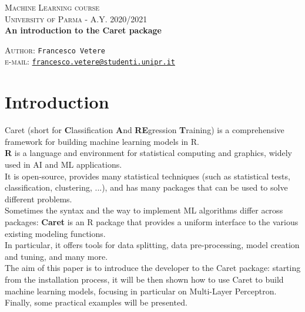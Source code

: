 \documentclass{article}
\begin{document}
\begin{titlepage}
  \begin{center}
     \Large\textsc{Machine Learning course\\University of Parma - A.Y. 2020/2021}\\
     \vspace{1cm}
     \Large\textbf{An introduction to the Caret package}\\
     \vspace{1cm}
     
      \large{\textsc{Author}: \texttt{Francesco Vetere}\\ \small \textsc{e-mail:} \href{mailto:francesco.vetere@studenti.unipr.it}{\texttt{francesco.vetere@studenti.unipr.it}} }
  \end{center}
\end{titlepage}

\tableofcontents

\section{Introduction}
Caret (short for \textbf{C}lassification \textbf{A}nd \textbf{RE}gression \textbf{T}raining) is a comprehensive framework for building machine learning models in R.\\

\textbf{R} is a language and environment for statistical computing and graphics, widely used in AI and ML applications.\\
It is open-source, provides many statistical techniques (such as statistical tests, classification, clustering, ...), and has many packages that can be used to solve different problems.\\

Sometimes the syntax and the way to implement ML algorithms differ across packages: \textbf{Caret} is an R package that provides a uniform interface to the various existing modeling functions.\\
In particular, it offers tools for data splitting, data pre-processing, model creation and tuning, and many more.\\

The aim of this paper is to introduce the developer to the Caret package: starting from the installation process, it will be then shown how to use Caret to build machine learning models, focusing in particular on Multi-Layer Perceptron.\\
Finally, some practical examples will be presented.\\
\end{document}
